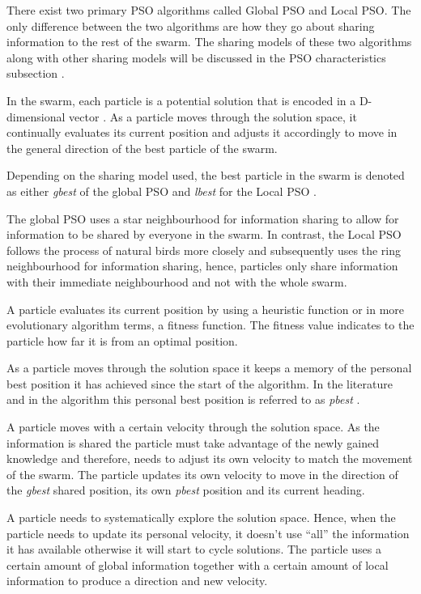There exist two primary PSO algorithms called Global PSO and Local PSO. The only difference between the two algorithms are how they go about sharing information to the rest of the swarm. The sharing models of these two algorithms along with other sharing models will be discussed in the PSO characteristics subsection \cite{SOSwarm}.

In the swarm, each particle is a potential solution that is encoded in a D-dimensional vector \cite{PSOHybridJobShop,PSOSelfHierarch}. As a particle moves through the solution space, it continually evaluates its current position and adjusts it accordingly to move in the general direction of the best particle of the swarm. 

Depending on the sharing model used, the best particle in the swarm is denoted as either \emph{gbest} of the global PSO and \emph{lbest} for the Local PSO \cite{SOSwarm,FundamentalSwarm,CompuIntelligenceIntro}. 

The global PSO uses a star neighbourhood for information sharing to allow for information to be shared by everyone in the swarm. In contrast, the Local PSO follows the process of natural birds more closely and subsequently uses the ring neighbourhood for information sharing, hence, particles only share information with their immediate neighbourhood and not with the whole swarm.

A particle evaluates its current position by using a heuristic function or in more evolutionary algorithm terms, a fitness function. The fitness value indicates to the particle how far it is from an optimal position\cite{CompuIntelligenceIntro}. 

As a particle moves through the solution space it keeps a memory of the personal best position it has achieved since the start of the algorithm. In the literature and in the algorithm this personal best position is referred to as \emph{pbest} \cite{SOSwarm}.

A particle moves with a certain velocity through the solution space. As the information is shared the particle must take advantage of the newly gained knowledge and therefore, needs to adjust its own velocity to match the movement of the swarm. The particle updates its own velocity to move in the direction of the \emph{gbest} shared position, its own \emph{pbest} position and its current heading.

A particle needs to systematically explore the solution space. Hence, when the particle needs to update its personal velocity, it doesn't use ``all'' the information it has available otherwise it will start to cycle solutions. The particle uses a certain amount of global information together with a certain amount of local information to produce a direction and new velocity\cite{FundamentalSwarm,CompuIntelligenceIntro,PSOSelfHierarch,SOSwarm}. 

